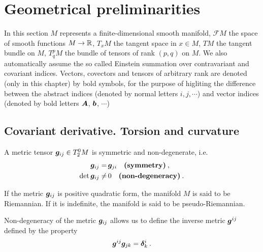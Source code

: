 \section{Geometrical preliminarities}

In this section $M$ represents a finite-dimensional smooth manifold, $\mathcal F M$ the space of smooth functions $M \to \mathbb{R}$, $T_x M$ the tangent space in $x \in M$, $T M$ the tangent bundle on $M$, $T^p_q M$ the bundle of tensors of rank $(p,q)$ on $M$. We also automatically assume the so called Einstein summation over contravariant and covariant indices. Vectors, covectors and tensors of arbitrary rank are denoted (only in this chapter) by bold symbols, for the purpose of higliting the difference between the abstract indices (denoted by normal letters $i,j,\cdots$) and vector indices (denoted by bold letters $\boldsymbol{A}$, $\boldsymbol{b}$, $\cdots$)

\subsection{Covariant derivative. Torsion and curvature}

\begin{definition}
    A metric tensor $\boldsymbol{g}_{ij} \in T^0_2 M$ is symmetric and non-degenerate, i.e.
    \begin{align}
        \boldsymbol{g}_{ij} =&\, \boldsymbol{g}_{ji} \quad \textbf{(symmetry)}\:, \\ \det \boldsymbol{g}_{ij} \neq&\, 0 \quad \textbf{(non-degeneracy)}\:.
    \end{align}
\end{definition}

If the metric $\boldsymbol{g}_{ij}$ is positive quadratic form, the manifold $M$ is said to be Riemannian. If it is indefinite, the manifold is said to be pseudo-Riemannian.

Non-degeneracy of the metric $\boldsymbol{g}_{ij}$ allows us to define the inverse metric $\boldsymbol{g}^{ij}$ defined by the property
\begin{align}
    \boldsymbol{g}^{ij} \boldsymbol{g}_{jk} = \boldsymbol{\delta}^i_k \:.
\end{align}


